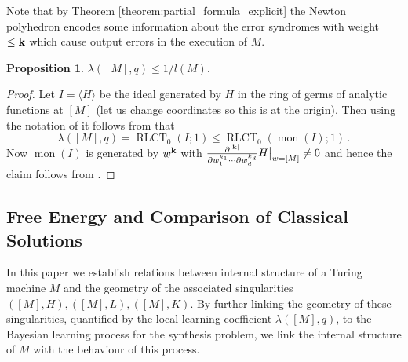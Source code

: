 \documentclass[english,letter paper,12pt,reqno]{article}
\theoremstyle{definition}
\newtheorem{proposition}[theorem]{Proposition}
\begin{document}
Note that by Theorem \ref{theorem:partial_formula_explicit} the Newton polyhedron encodes some information about the error syndromes with weight $\le \bold{k}$ which cause output errors in the execution of $M$.

\begin{proposition}\label{prop:upper_bound_RLCT} $\lambda([M], q) \le 1/l(M)$.
\end{proposition}
\begin{proof}
Let $I = \langle H \rangle$ be the ideal generated by $H$ in the ring of germs of analytic functions at $[M]$ (let us change coordinates so this is at the origin). Then using the notation of \cite[Proposition 4.3]{lin2011algebraic} it follows from \cite[Proposition 4.8]{lin2011algebraic} that
\[
\lambda([M], q) = \operatorname{RLCT}_0(I ; 1) \le \operatorname{RLCT}_0(\operatorname{mon}(I) ; 1)\,.
\]
Now $\operatorname{mon}(I)$ is generated by $w^{\bold{k}}$ with $\frac{\partial^{|\bold{k}|}}{ \partial w_1^{k_1} \cdots \partial w_d^{k_d}} H \bigr|_{w = [M]} \neq 0$ and hence the claim follows from \cite[Theorem 4.18]{lin2011algebraic}.    
\end{proof}


\subsection{Free Energy and Comparison of Classical Solutions}\label{section:free_energy}

In this paper we establish relations between internal structure of a Turing machine $M$ and the geometry of the associated singularities $([M], H), ([M], L), ([M], K)$. By further linking the geometry of these singularities, quantified by the local learning coefficient $\lambda([M], q)$, to the Bayesian learning process for the synthesis problem, we link the internal structure of $M$ with the behaviour of this process.
\end{document}
